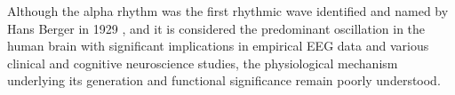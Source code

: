 \documentclass[12pt,twoside]{article}
\begin{document}
Although the alpha rhythm was the first rhythmic wave identified and named by Hans Berger in 1929  \citep{berger1929elektroenkephalogramm, tudor2005hans}, and it is considered the predominant oscillation in the human brain \citep{klimesch2012alpha} with significant implications in empirical EEG data and various clinical and cognitive neuroscience studies, the physiological mechanism underlying its generation and functional significance remain poorly understood.
\end{document}
